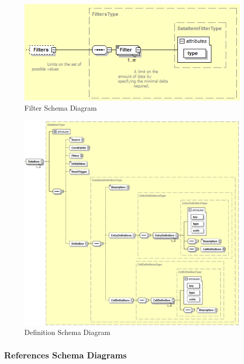 \FloatBarrier


\begin{figure}[ht]
  \centering
    \includegraphics[width=1.0\textwidth]{figures/Filter Schema.png}
  \caption{Filter Schema Diagram}
  \label{fig:Filter Schema Diagram}
\end{figure}

\FloatBarrier


\begin{figure}[ht]
  \centering
    \includegraphics[width=1.0\textwidth]{figures/Definition Schema.png}
  \caption{Definition Schema Diagram}
  \label{fig:Definition Schema Diagram}
\end{figure}

\FloatBarrier


\subsubsection{References Schema Diagrams}
\label{sec:References Schema Diagrams}

